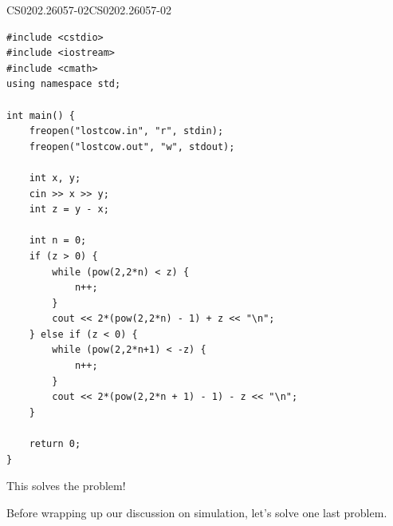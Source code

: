 \documentclass[../../main.tex]{subfiles}
\begin{document}
\begin{solution}
\begin{cppboxSolution}{CS0202.26057-02}{CS0202.26057-02}
\begin{lstlisting}[style=cppstyle]
#include <cstdio>
#include <iostream>
#include <cmath>
using namespace std;

int main() {
    freopen("lostcow.in", "r", stdin);
    freopen("lostcow.out", "w", stdout);

    int x, y;
    cin >> x >> y;
    int z = y - x;

    int n = 0;
    if (z > 0) {
        while (pow(2,2*n) < z) {
            n++;
        }
        cout << 2*(pow(2,2*n) - 1) + z << "\n";
    } else if (z < 0) {
        while (pow(2,2*n+1) < -z) {
            n++;
        }
        cout << 2*(pow(2,2*n + 1) - 1) - z << "\n";
    }

    return 0;
}
\end{lstlisting}
\end{cppboxSolution}

This solves the problem!
\end{solution}

Before wrapping up our discussion on simulation, let's solve one last
problem.
\end{document}
